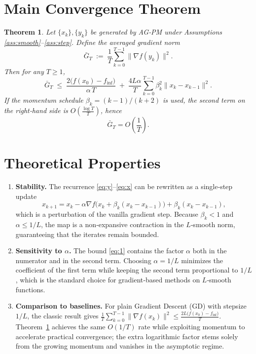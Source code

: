 \documentclass{article}
\newtheorem{theorem}{Theorem}
\begin{document}
\section*{Main Convergence Theorem}
\begin{theorem}\label{thm:main}
Let $\{x_k\},\{y_k\}$ be generated by AG‑PM under Assumptions
\ref{ass:smooth}–\ref{ass:step}. Define the averaged gradient norm
\[
\bar G_T \;:=\; \frac{1}{T}\sum_{k=0}^{T-1}\bigl\|\nabla f(y_k)\bigr\|^2 .
\]
Then for any $T\ge 1$,
\[
\bar G_T \;\le\;
\frac{2\bigl(f(x_0)-f_{\inf}\bigr)}{\alpha\,T}
\;+\;
\frac{4L\alpha}{T}\sum_{k=0}^{T-1}\beta_k^2\|x_k-x_{k-1}\|^2 .
\tag{1}
\]
If the momentum schedule $\beta_k=(k-1)/(k+2)$ is used,
the second term on the right‑hand side is $O\!\left(\frac{\log T}{T}\right)$,
hence
\[
\bar G_T = O\!\left(\frac{1}{T}\right).
\]
\end{theorem}

\section*{Theoretical Properties}
\begin{enumerate}[label=\arabic*.]
\item \textbf{Stability.} The recurrence \eqref{eq:y}–\eqref{eq:x} can be rewritten as a
single‑step update
\[
x_{k+1}=x_k-\alpha\nabla f\!\bigl(x_k+\beta_k(x_k-x_{k-1})\bigr)
      +\beta_k(x_k-x_{k-1}),
\]
which is a perturbation of the vanilla gradient step. Because $\beta_k<1$
and $\alpha\le 1/L$, the map is a non‑expansive contraction in the
$L$‑smooth norm, guaranteeing that the iterates remain bounded.

\item \textbf{Sensitivity to $\alpha$.}
The bound \eqref{eq:1} contains the factor $\alpha$ both in the numerator and
in the second term. Choosing $\alpha=1/L$ minimizes the coefficient of the
first term while keeping the second term proportional to $1/L$, which is the
standard choice for gradient‑based methods on $L$‑smooth functions.

\item \textbf{Comparison to baselines.}
For plain Gradient Descent (GD) with stepsize $1/L$, the classic result gives
$\frac{1}{T}\sum_{k=0}^{T-1}\|\nabla f(x_k)\|^2\le
\frac{2L\bigl(f(x_0)-f_{\inf}\bigr)}{T}$.
Theorem~\ref{thm:main} achieves the same $O(1/T)$ rate while
exploiting momentum to accelerate practical convergence; the extra
logarithmic factor stems solely from the growing momentum and vanishes in
the asymptotic regime.

\end{enumerate}
\end{document}

